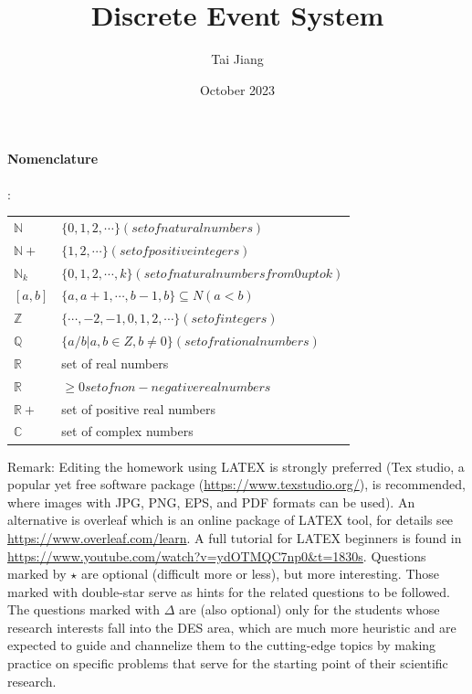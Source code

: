 \documentclass{article}
\title{Discrete Event System}
\author{Tai Jiang}
\date{October 2023}
\begin{document}
  \maketitle
  \tableofcontents
  \newpage
\paragraph{Nomenclature}:

\begin{tabular}{l l}
  $\mathbb{N}$ & $\{0, 1, 2, \cdots  \} (set of natural numbers) $ \\
  $\mathbb{N}+$ & $\{1, 2, \cdots \} (set of positive integers)$ \\
  $\mathbb{N}_k$ & $\{0, 1, 2, \cdots , k\} (set of natural numbers from 0 up to k)$ \\
  $[a, b]$ & $\{a, a + 1, \cdots , b - 1, b\} \subseteq  N (a < b)$ \\
  $\mathbb{Z}$ & $\{\cdots , -2, -1, 0, 1, 2, \cdots \} (set of integers)$ \\
  $\mathbb{Q}$ & $\{a/b | a, b \in  Z, b \neq  0\} (set of rational numbers)$ \\
  $\mathbb{R}$ & set of real numbers \\
  $\mathbb{R}$ & $\geq 0 set of non-negative real numbers$ \\
  $\mathbb{R}+$ & set of positive real numbers \\
  $\mathbb{C}$ & set of complex numbers \\
\end{tabular}



\begin{tcolorbox}
  Remark: Editing the homework using LATEX is strongly preferred (Tex studio, a popular yet free software package (\url{https://www.texstudio.org/}), is recommended, where images with JPG, PNG, EPS, and PDF formats can be used). An alternative is overleaf which is an online package of LATEX tool, for details see \url{https://www.overleaf.com/learn}. A full tutorial for LATEX beginners is found in \url{https://www.youtube.com/watch?v=ydOTMQC7np0\&t=1830s}. Questions marked by $\star $ are optional (diﬀicult more or less), but more interesting. Those marked with double-star serve as hints for the related questions to be followed. The questions marked with $\Delta $ are (also optional) only for the students whose research interests fall into the DES area, which are much more heuristic and are expected to guide and channelize them to the cutting-edge topics by making practice on specific problems that serve for the starting point of their scientific research.
\end{tcolorbox}
\end{document}
